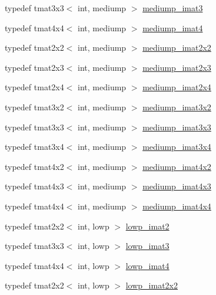 \begin{DoxyCompactItemize}
\item 
typedef tmat3x3$<$ int, mediump $>$ \hyperlink{group__gtc__matrix__integer_gab033bd6a2bfebb1aa35d458c6f077ccb}{mediump\+\_\+imat3}
\item 
typedef tmat4x4$<$ int, mediump $>$ \hyperlink{group__gtc__matrix__integer_ga680c97868de08658ca4924718d951def}{mediump\+\_\+imat4}
\item 
typedef tmat2x2$<$ int, mediump $>$ \hyperlink{group__gtc__matrix__integer_ga52a40f2f95562746fd8084726a300963}{mediump\+\_\+imat2x2}
\item 
typedef tmat2x3$<$ int, mediump $>$ \hyperlink{group__gtc__matrix__integer_ga07314e9f05b82367570ca44c3ef7c0a7}{mediump\+\_\+imat2x3}
\item 
typedef tmat2x4$<$ int, mediump $>$ \hyperlink{group__gtc__matrix__integer_ga944a139f15de6bc12e9c7bf615ffc4f5}{mediump\+\_\+imat2x4}
\item 
typedef tmat3x2$<$ int, mediump $>$ \hyperlink{group__gtc__matrix__integer_ga8f682b5b64e2072c0729409ee6bfe2af}{mediump\+\_\+imat3x2}
\item 
typedef tmat3x3$<$ int, mediump $>$ \hyperlink{group__gtc__matrix__integer_gab4c647321a342c58119144ad08c6c406}{mediump\+\_\+imat3x3}
\item 
typedef tmat3x4$<$ int, mediump $>$ \hyperlink{group__gtc__matrix__integer_ga721a754fc35cc5ac097e331d893a6b2c}{mediump\+\_\+imat3x4}
\item 
typedef tmat4x2$<$ int, mediump $>$ \hyperlink{group__gtc__matrix__integer_gabfe107153637dfd7a0c272ff1ba892ed}{mediump\+\_\+imat4x2}
\item 
typedef tmat4x3$<$ int, mediump $>$ \hyperlink{group__gtc__matrix__integer_ga0da8b13e141337d016a6541ea2c0362c}{mediump\+\_\+imat4x3}
\item 
typedef tmat4x4$<$ int, mediump $>$ \hyperlink{group__gtc__matrix__integer_gae226af929e72730be59a58d89a4be028}{mediump\+\_\+imat4x4}
\item 
typedef tmat2x2$<$ int, lowp $>$ \hyperlink{group__gtc__matrix__integer_ga4840a4d8b9e8997f1173da9e8e5e4de4}{lowp\+\_\+imat2}
\item 
typedef tmat3x3$<$ int, lowp $>$ \hyperlink{group__gtc__matrix__integer_ga2f7d17630aa9e27bb9e62f98603a4d7e}{lowp\+\_\+imat3}
\item 
typedef tmat4x4$<$ int, lowp $>$ \hyperlink{group__gtc__matrix__integer_gad9a60f2ee78750d31b129c01096751b6}{lowp\+\_\+imat4}
\item 
typedef tmat2x2$<$ int, lowp $>$ \hyperlink{group__gtc__matrix__integer_gad1950bd75bc033e8511cec3deb15af56}{lowp\+\_\+imat2x2}

\end{DoxyCompactItemize}
